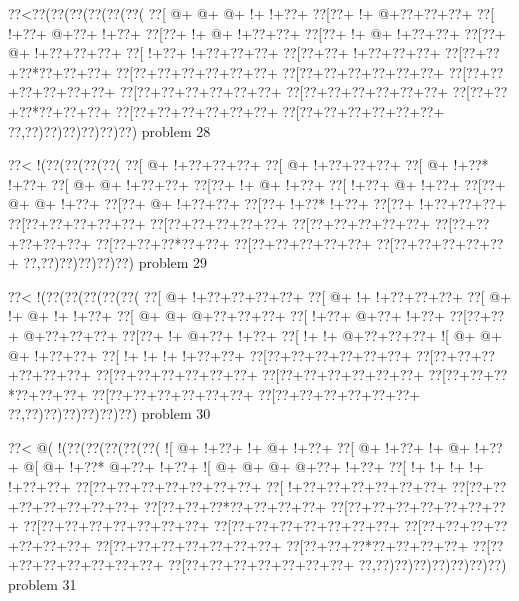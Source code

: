 \vbox{\vbox{\goo
\0??<\0??(\0??(\0??(\0??(\0??(\0??(
\0??[\- @+\- @+\- @+\- !+\- !+\0??+
\0??[\0??+\- !+\- @+\0??+\0??+\0??+
\0??[\- !+\0??+\- @+\0??+\- !+\0??+
\0??[\0??+\- !+\- @+\- !+\0??+\0??+
\0??[\0??+\- !+\- @+\- !+\0??+\0??+
\0??[\0??+\- @+\- !+\0??+\0??+\0??+
\0??[\- !+\0??+\- !+\0??+\0??+\0??+
\0??[\0??+\0??+\- !+\0??+\0??+\0??+
\0??[\0??+\0??+\0??*\0??+\0??+\0??+
\0??[\0??+\0??+\0??+\0??+\0??+\0??+
\0??[\0??+\0??+\0??+\0??+\0??+\0??+
\0??[\0??+\0??+\0??+\0??+\0??+\0??+
\0??[\0??+\0??+\0??+\0??+\0??+\0??+
\0??[\0??+\0??+\0??+\0??+\0??+\0??+
\0??[\0??+\0??+\0??*\0??+\0??+\0??+
\0??[\0??+\0??+\0??+\0??+\0??+\0??+
\0??[\0??+\0??+\0??+\0??+\0??+\0??+
\0??,\0??)\0??)\0??)\0??)\0??)\0??)
}
\hfil problem 28\hfil\break
}

\vbox{\vbox{\goo
\0??<\- !(\0??(\0??(\0??(\0??(
\0??[\- @+\- !+\0??+\0??+\0??+
\0??[\- @+\- !+\0??+\0??+\0??+
\0??[\- @+\- !+\0??*\- !+\0??+
\0??[\- @+\- @+\- !+\0??+\0??+
\0??[\0??+\- !+\- @+\- !+\0??+
\0??[\- !+\0??+\- @+\- !+\0??+
\0??[\0??+\- @+\- @+\- !+\0??+
\0??[\0??+\- @+\- !+\0??+\0??+
\0??[\0??+\- !+\0??*\- !+\0??+
\0??[\0??+\- !+\0??+\0??+\0??+
\0??[\0??+\0??+\0??+\0??+\0??+
\0??[\0??+\0??+\0??+\0??+\0??+
\0??[\0??+\0??+\0??+\0??+\0??+
\0??[\0??+\0??+\0??+\0??+\0??+
\0??[\0??+\0??+\0??*\0??+\0??+
\0??[\0??+\0??+\0??+\0??+\0??+
\0??[\0??+\0??+\0??+\0??+\0??+
\0??,\0??)\0??)\0??)\0??)\0??)
}
\hfil problem 29\hfil\break
}

\vbox{\vbox{\goo
\0??<\- !(\0??(\0??(\0??(\0??(\0??(
\0??[\- @+\- !+\0??+\0??+\0??+\0??+
\0??[\- @+\- !+\- !+\0??+\0??+\0??+
\0??[\- @+\- !+\- @+\- !+\- !+\0??+
\0??[\- @+\- @+\- @+\0??+\0??+\0??+
\0??[\- !+\0??+\- @+\0??+\- !+\0??+
\0??[\0??+\0??+\- @+\0??+\0??+\0??+
\0??[\0??+\- !+\- @+\0??+\- !+\0??+
\0??[\- !+\- !+\- @+\0??+\0??+\0??+
\- ![\- @+\- @+\- @+\- !+\0??+\0??+
\0??[\- !+\- !+\- !+\- !+\0??+\0??+
\0??[\0??+\0??+\0??+\0??+\0??+\0??+
\0??[\0??+\0??+\0??+\0??+\0??+\0??+
\0??[\0??+\0??+\0??+\0??+\0??+\0??+
\0??[\0??+\0??+\0??+\0??+\0??+\0??+
\0??[\0??+\0??+\0??*\0??+\0??+\0??+
\0??[\0??+\0??+\0??+\0??+\0??+\0??+
\0??[\0??+\0??+\0??+\0??+\0??+\0??+
\0??,\0??)\0??)\0??)\0??)\0??)\0??)
}
\hfil problem 30\hfil\break
}

\vbox{\vbox{\goo
\0??<\- @(\- !(\0??(\0??(\0??(\0??(\0??(
\- ![\- @+\- !+\0??+\- !+\- @+\- !+\0??+
\0??[\- @+\- !+\0??+\- !+\- @+\- !+\0??+
\- @[\- @+\- !+\0??*\- @+\0??+\- !+\0??+
\- ![\- @+\- @+\- @+\- @+\0??+\- !+\0??+
\0??[\- !+\- !+\- !+\- !+\- !+\0??+\0??+
\0??[\0??+\0??+\0??+\0??+\0??+\0??+\0??+
\0??[\- !+\0??+\0??+\0??+\0??+\0??+\0??+
\0??[\0??+\0??+\0??+\0??+\0??+\0??+\0??+
\0??[\0??+\0??+\0??*\0??+\0??+\0??+\0??+
\0??[\0??+\0??+\0??+\0??+\0??+\0??+\0??+
\0??[\0??+\0??+\0??+\0??+\0??+\0??+\0??+
\0??[\0??+\0??+\0??+\0??+\0??+\0??+\0??+
\0??[\0??+\0??+\0??+\0??+\0??+\0??+\0??+
\0??[\0??+\0??+\0??+\0??+\0??+\0??+\0??+
\0??[\0??+\0??+\0??*\0??+\0??+\0??+\0??+
\0??[\0??+\0??+\0??+\0??+\0??+\0??+\0??+
\0??[\0??+\0??+\0??+\0??+\0??+\0??+\0??+
\0??,\0??)\0??)\0??)\0??)\0??)\0??)\0??)
}
\hfil problem 31\hfil\break
}


